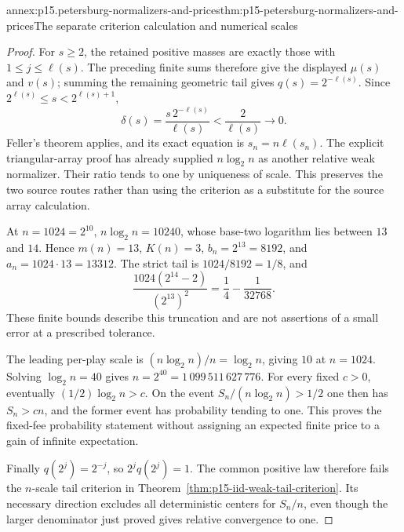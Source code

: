 \begin{annexitem}{annex:p15.petersburg-normalizers-and-prices}{thm:p15-petersburg-normalizers-and-prices}{The separate criterion calculation and numerical scales}
\begin{proof}
For \(s\geq2\), the retained positive masses are exactly those
with \(1\leq j\leq\ell(s)\). The preceding finite sums therefore
give the displayed \(\mu(s)\) and \(v(s)\); summing the remaining
geometric tail gives \(q(s)=2^{-\ell(s)}\).
Since \(2^{\ell(s)}\leq s<2^{\ell(s)+1}\),
\[
 \delta(s)=\frac{s\,2^{-\ell(s)}}{\ell(s)}
             <\frac2{\ell(s)}\longrightarrow0.
\]
Feller's theorem applies, and its exact equation is
\(s_n=n\ell(s_n)\). The explicit triangular-array proof has
already supplied \(n\log_2n\) as another relative weak
normalizer. Their ratio tends to one by uniqueness of scale.
This preserves the two source routes rather than using the
criterion as a substitute for the source array calculation.

At \(n=1024=2^{10}\), \(n\log_2n=10240\), whose base-two
logarithm lies between \(13\) and \(14\).
Hence \(m(n)=13\), \(K(n)=3\), \(b_n=2^{13}=8192\), and
\(a_n=1024\cdot13=13312\).
The strict tail is \(1024/8192=1/8\), and
\[
 \frac{1024(2^{14}-2)}{(2^{13})^2}
   =\frac14-\frac1{32768}.
\]
These finite bounds describe this truncation and are not
assertions of a small error at a prescribed tolerance.

The leading per-play scale is
\((n\log_2n)/n=\log_2n\), giving \(10\) at \(n=1024\).
Solving \(\log_2n=40\) gives
\(n=2^{40}=1\,099\,511\,627\,776\).
For every fixed \(c>0\), eventually
\((1/2)\log_2n>c\). On the event
\(S_n/(n\log_2n)>1/2\) one then has \(S_n>cn\), and the
former event has probability tending to one. This proves the
fixed-fee probability statement without assigning an expected
finite price to a gain of infinite expectation.

Finally \(q(2^j)=2^{-j}\), so \(2^jq(2^j)=1\).
The common positive law therefore fails the \(n\)-scale tail
criterion in Theorem~\ref{thm:p15-iid-weak-tail-criterion}.
Its necessary direction excludes all deterministic centers
for \(S_n/n\), even though the larger denominator just proved
gives relative convergence to one.
\end{proof}
\end{annexitem}

